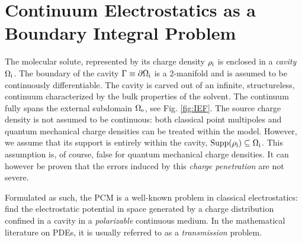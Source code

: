 \section{Continuum Electrostatics as a Boundary Integral Problem}\label{sec:IEF}

The molecular solute, represented by its charge density
$\rho_\mathrm{i}$ is enclosed in a \emph{cavity} $\Omega_\mathrm{i}$.
The boundary of the cavity $\Gamma\equiv\partial\Omega_\mathrm{i}$ is a
2-manifold and is assumed to be continuously differentiable.
The cavity is carved out of an infinite, structureless, continuum
characterized by the bulk properties of the solvent.
The continuum fully spans the external subdomain $\Omega_\mathrm{e}$, see Fig. \ref{fig:IEF}.
The source charge density is not assumed to be continuous: both
classical point multipoles and quantum mechanical charge densities can
be treated within the model.
However, we assume that its support is entirely within the cavity,
$\mathop{}\!\mathrm{Supp}(\rho_\mathrm{i}) \subseteq \Omega_\mathrm{i}$. This assumption is, of course, false
for quantum mechanical charge densities. It can however be proven that
the errors induced by this \emph{charge penetration} are not
severe.\autocite{Chipman2000-us, Cances2001-qs, Cances2001-qn}

Formulated as such, the \gls*{PCM} is a well-known problem in classical
electrostatics: find the electrostatic potential in space generated by
a charge distribution confined in a cavity in a \emph{polarizable}
continuous medium.\autocite{Jackson1999, Vanderlinde2005-gf}
In the mathematical literature on \acp{PDE}, it is usually referred to as a
\emph{transmission} problem.\autocite{Hackbusch1995-uq, Sauter2011-an}

